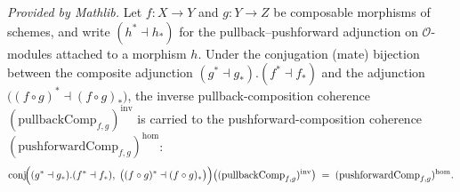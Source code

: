 



\begin{lemma}
  \label{lem:conjugateEquiv_pullbackComp_inv_mathlib}
  \mathlibok
  \textit{Provided by Mathlib.}
  Let \(f : X \to Y\) and \(g : Y \to Z\) be composable morphisms of schemes, and write
  \((h^{*} \dashv h_{*})\) for the pullback--pushforward adjunction on \(\mathcal{O}\)-modules
  attached to a morphism \(h\). Under the conjugation (mate) bijection between the composite
  adjunction \((g^{*}\dashv g_{*}) . (f^{*}\dashv f_{*})\) and the adjunction
  \(\bigl((f\circ g)^{*} \dashv (f\circ g)_{*}\bigr)\), the inverse pullback-composition coherence
  \((\mathrm{pullbackComp}_{f,g})^{\mathrm{inv}}\) is carried to the pushforward-composition
  coherence \((\mathrm{pushforwardComp}_{f,g})^{\mathrm{hom}}\):
  \[
    \operatorname{conj}\!\Bigl((g^{*}\dashv g_{*}) . (f^{*}\dashv f_{*}),\;
      \bigl((f\circ g)^{*}\dashv (f\circ g)_{*}\bigr)\Bigr)
      \bigl((\mathrm{pullbackComp}_{f,g})^{\mathrm{inv}}\bigr)
    \;=\; (\mathrm{pushforwardComp}_{f,g})^{\mathrm{hom}}.
  \]
\end{lemma}





